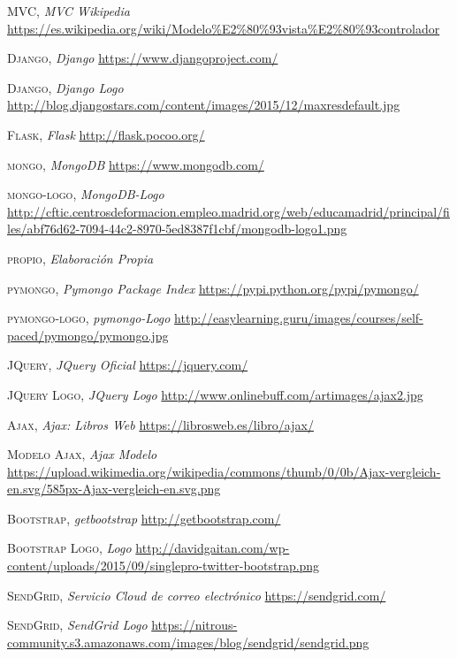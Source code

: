 \documentclass[a4paper,11pt]{book}
\begin{document}
\begin{thebibliography}{aaaa}
 \textsc{MVC},
\textit{MVC Wikipedia}
\url{https://es.wikipedia.org/wiki/Modelo%E2%80%93vista%E2%80%93controlador}

 \textsc{Django},
\textit{Django}
\url{https://www.djangoproject.com/}

 \textsc{Django},
\textit{Django Logo}
\url{http://blog.djangostars.com/content/images/2015/12/maxresdefault.jpg}

 \textsc{Flask},
\textit{Flask}
\url{http://flask.pocoo.org/}

 \textsc{mongo},
\textit{MongoDB}
\url{https://www.mongodb.com/}

 \textsc{mongo-logo},
\textit{MongoDB-Logo}
\url{http://cftic.centrosdeformacion.empleo.madrid.org/web/educamadrid/principal/files/abf76d62-7094-44c2-8970-5ed8387f1cbf/mongodb-logo1.png}

 \textsc{propio},
\textit{Elaboración Propia}
\url{}

 \textsc{pymongo},
\textit{Pymongo Package Index }
\url{https://pypi.python.org/pypi/pymongo/}

 \textsc{pymongo-logo},
\textit{pymongo-Logo}
\url{http://easylearning.guru/images/courses/self-paced/pymongo/pymongo.jpg}

 \textsc{JQuery},
\textit{JQuery Oficial}
\url{https://jquery.com/}

 \textsc{JQuery Logo},
\textit{JQuery Logo}
\url{http://www.onlinebuff.com/artimages/ajax2.jpg}

 \textsc{Ajax},
\textit{Ajax: Libros Web}
\url{https://librosweb.es/libro/ajax/}

 \textsc{Modelo Ajax},
\textit{Ajax Modelo}
\url{https://upload.wikimedia.org/wikipedia/commons/thumb/0/0b/Ajax-vergleich-en.svg/585px-Ajax-vergleich-en.svg.png}



 \textsc{Bootstrap},
\textit{getbootstrap}
\url{http://getbootstrap.com/}

 \textsc{Bootstrap Logo},
\textit{Logo}
\url{http://davidgaitan.com/wp-content/uploads/2015/09/singlepro-twitter-bootstrap.png}


 \textsc{SendGrid},
\textit{Servicio Cloud de correo electrónico }
\url{https://sendgrid.com/}

 \textsc{SendGrid},
\textit{SendGrid Logo}
\url{https://nitrous-community.s3.amazonaws.com/images/blog/sendgrid/sendgrid.png}




\end{thebibliography}
\end{document}
